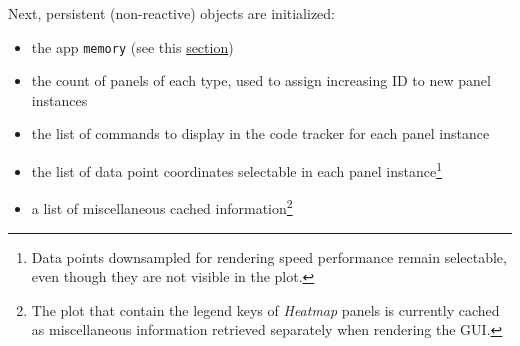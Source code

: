 \documentclass[]{book}
\providecommand{\tightlist}{%
  \setlength{\itemsep}{0pt}\setlength{\parskip}{0pt}}
\let\rmarkdownfootnote\footnote%
\def\footnote{\protect\rmarkdownfootnote}
\begin{document}
Next, persistent (non-reactive) objects are initialized:

\begin{itemize}
\tightlist
\item
  the app \texttt{memory} (see this \protect\hyperlink{memory}{section})
\item
  the count of panels of each type, used to assign increasing ID to new panel instances
\item
  the list of commands to display in the code tracker for each panel instance
\item
  the list of data point coordinates selectable in each panel instance\footnote{Data points downsampled for rendering speed performance remain selectable, even though they are not visible in the plot.}
\item
  a list of miscellaneous cached information\footnote{The plot that contain the legend keys of \emph{Heatmap} panels is currently cached as miscellaneous information retrieved separately when rendering the GUI.}
\end{itemize}


\end{document}
